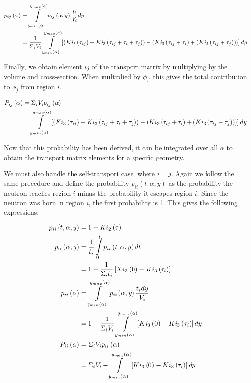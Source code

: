 \begin{align}
p_{ij}\left(\alpha\right) &= \intop_{y_{min}\left(\alpha\right)}^{y_{max}\left(\alpha\right)} p_{ij}\left(\alpha,y\right) \frac{t_i}{V_i} dy \nonumber\\
&= \frac{1}{\Sigma_i V_i} \intop_{y_{min}\left(\alpha\right)}^{y_{max}\left(\alpha\right)} \left[\left(Ki_3\left(\tau_{ij}\right) + Ki_3\left(\tau_{ij} + \tau_i + \tau_j\right)\right) - \left(Ki_3\left(\tau_{ij} + \tau_i\right) + \left(Ki_3\left(\tau_{ij} + \tau_j\right)\right)\right)\right] dy
\end{align}

Finally, we obtain element $ij$ of the transport matrix by multiplying by the volume and cross-section.  When multiplied by $\phi_i$, this gives the total contribution to $\phi_j$ from region $i$.

\begin{align}\label{e:CPPij}
P_{ij}\left(\alpha\right) &= \Sigma_i V_i p_{ij}\left(\alpha\right) \nonumber \\
&= \intop_{y_{min}\left(\alpha\right)}^{y_{max}\left(\alpha\right)} \left[\left(Ki_3\left(\tau_{ij}\right) + Ki_3\left(\tau_{ij} + \tau_i + \tau_j\right)\right) - \left(Ki_3\left(\tau_{ij} + \tau_i\right) + \left(Ki_3\left(\tau_{ij} + \tau_j\right)\right)\right)\right] dy
\end{align}

Now that this probability has been derived, it can be integrated over all $\alpha$ to obtain the transport matrix elements for a specific geometry.

We must also handle the self-transport case, where $i=j$.  Again we follow the same procedure and define the probability $p_{ii}\left(t, \alpha, y\right)$ as the probability the neutron reaches region $i$ minus the probability it escapes region $i$.  Since the neutron was born in region $i$, the first probability is 1.  This gives the following expressions:

\begin{subequations}\label{e:CPPii}
  \begin{align}
  p_{ii}\left(t,\alpha,y\right) &= 1 - Ki_2\left(\tau\right) \\
  p_{ii}\left(\alpha,y\right) &= \frac{1}{t_i} \intop_0^{t_i} p_{ii}\left(t,\alpha,y\right) dt \nonumber \\
  &= 1- \frac{1}{\Sigma_i t_i} \left[Ki_3\left(0\right) - Ki_3\left(\tau_i\right)\right] \\
  p_{ii}\left(\alpha\right) &= \intop_{y_{min}\left(\alpha\right)}^{y_{max}\left(\alpha\right)} p_{ii}\left(\alpha,y\right) \frac{t_i dy}{V_i} \nonumber\\
  &= 1 - \frac{1}{\Sigma_i V_i} \intop_{y_{min}\left(\alpha\right)}^{y_{max}\left(\alpha\right)} \left[Ki_3\left(0\right) - Ki_3\left(\tau_i\right)\right] dy \\
  P_{ii}\left(\alpha\right) &= \Sigma_i V_i p_{ii}\left(\alpha\right) \nonumber \\
  &= \Sigma_i V_i - \intop_{y_{min}\left(\alpha\right)}^{y_{max}\left(\alpha\right)} \left[Ki_3\left(0\right) - Ki_3\left(\tau_i\right)\right] dy
  \end{align}
\end{subequations}

